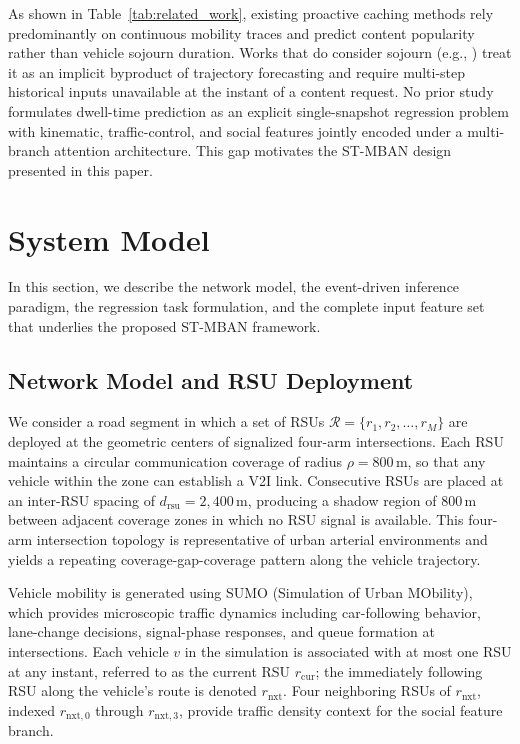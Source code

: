 \documentclass[journal]{IEEEtran}
\begin{document}
As shown in Table~\ref{tab:related_work}, existing proactive caching methods rely predominantly
on continuous mobility traces and predict content popularity rather than vehicle sojourn duration.
Works that do consider sojourn (e.g., \cite{39,42,45}) treat it as an implicit byproduct of
trajectory forecasting and require multi-step historical inputs unavailable at the instant of
a content request.
No prior study formulates dwell-time prediction as an explicit single-snapshot regression problem
with kinematic, traffic-control, and social features jointly encoded under a multi-branch attention architecture.
This gap motivates the ST-MBAN design presented in this paper.

\section{System Model}\label{sec:system}

In this section, we describe the network model, the event-driven inference paradigm,
the regression task formulation, and the complete input feature set that underlies
the proposed ST-MBAN framework.

\subsection{Network Model and RSU Deployment}
\label{sec.net.A}

We consider a road segment in which a set of RSUs
$\mathcal{R} = \{r_1, r_2, \ldots, r_M\}$ are deployed at the geometric centers
of signalized four-arm intersections.
Each RSU maintains a circular communication coverage of radius
$\rho = 800\,\text{m}$, so that any vehicle within the zone can establish a V2I link.
Consecutive RSUs are placed at an inter-RSU spacing of $d_{\text{rsu}} = 2{,}400\,\text{m}$,
producing a shadow region of $800\,\text{m}$ between adjacent coverage zones in which
no RSU signal is available.
This four-arm intersection topology is representative of urban arterial environments
and yields a repeating coverage-gap-coverage pattern along the vehicle trajectory.

Vehicle mobility is generated using SUMO (Simulation of Urban MObility), which
provides microscopic traffic dynamics including car-following behavior,
lane-change decisions, signal-phase responses, and queue formation at intersections.
Each vehicle $v$ in the simulation is associated with at most one RSU at any instant,
referred to as the current RSU $r_{\text{cur}}$; the immediately following RSU along
the vehicle's route is denoted $r_{\text{nxt}}$.
Four neighboring RSUs of $r_{\text{nxt}}$, indexed $r_{\text{nxt},0}$ through
$r_{\text{nxt},3}$, provide traffic density context for the social feature branch.
\end{document}
